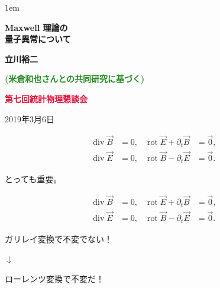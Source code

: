 \documentclass[xcolor={svgnames,rgb}]{beamer}
\date[]{}
\def\bff{\ifmmode\else\bfseries\fi}
\def\red#1{\textcolor{Crimson}{\bff #1}}
\def\green#1{\textcolor{ForestGreen}{\bff #1}}
\def\blue#1{\textcolor{myblue}{\bff #1}}
\def\alert#1{\red{#1}}
\begin{document}
\parskip1em 
\boldmath
\def\baselinestretch{1.1}



\def\incb#1{\vcenter{\hbox{\texttt{[image: \#1]}}}}
\def\inc#1{\vcenter{\hbox{\texttt{[image: \#1]}}}}
\def\incc#1{\vcenter{\hbox{\texttt{[image: \#1]}}}}

\begin{frame}
\bigskip\bigskip\bigskip\bigskip\bigskip

\vfill


\begin{exampleblock}{}
\begin{center}\LARGE\bfseries
\color{math}
Maxwell 理論の\\
量子異常について
\end{center}
\end{exampleblock}

\bigskip\bigskip\bigskip
\begin{center}
\large  \blue{立川裕二} 

\green{(米倉和也さんとの共同研究に基づく)}

\bigskip
\large \alert{第七回統計物理懇談会}

\bigskip
\large 2019年3月6日
\end{center}
\bigskip\bigskip\bigskip
\vfill


\end{frame}



\def\div{\mathop{\mathrm{div}}}
\def\rot{\mathop{\mathrm{rot}}}
\begin{frame}
\LARGE
\begin{align*}
\div \vec B&=0,  &\rot \vec E + \partial_t \vec B&=\vec 0, \\
\div \vec E&=0, & \rot \vec B - \partial_t \vec E&=\vec 0.
\end{align*}
\begin{center}

\bigskip\bigskip

とっても重要。
\end{center}

\end{frame}

\begin{frame}
\LARGE
\begin{align*}
\div \vec B&=0,  &\rot \vec E + \partial_t \vec B&=\vec 0, \\
\div \vec E&=0, & \rot \vec B - \partial_t \vec E&=\vec 0.
\end{align*}
\begin{center}
ガリレイ変換で不変でない！ 

$\downarrow$

ローレンツ変換で不変だ！
\end{center}

\end{frame}
\end{document}
